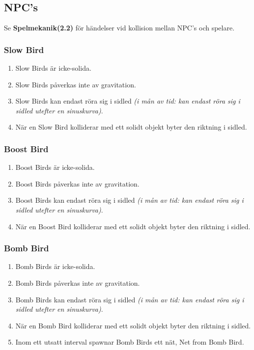 \documentclass{TDP003mall}
\begin{document}
\subsection{NPC's}
Se \textbf{Spelmekanik(2.2)} för händelser vid kollision mellan NPC's och spelare.

\subsubsection{Slow Bird}
\begin{enumerate}
\item Slow Birds är icke-solida.
\item Slow Birds påverkas inte av gravitation.
\item Slow Birds kan endast röra sig i sidled \textit{(i mån av tid: kan endast röra sig i sidled utefter en sinuskurva)}.
\item När en Slow Bird kolliderar med ett solidt objekt byter den riktning i sidled.
\end{enumerate}

\subsubsection{Boost Bird}
\begin{enumerate}
\item Boost Birds är icke-solida.
\item Boost Birds påverkas inte av gravitation.
\item Boost Birds kan endast röra sig i sidled \textit{(i mån av tid: kan endast röra sig i sidled utefter en sinuskurva)}.
\item När en Boost Bird kolliderar med ett solidt objekt byter den riktning i sidled.
\end{enumerate}

\subsubsection{Bomb Bird}
\begin{enumerate}
\item Bomb Birds är icke-solida.
\item Bomb Birds påverkas inte av gravitation.
\item Bomb Birds kan endast röra sig i sidled \textit{(i mån av tid: kan endast röra sig i sidled utefter en sinuskurva)}.
\item När en Bomb Bird kolliderar med ett solidt objekt byter den riktning i sidled.
\item Inom ett utsatt interval spawnar Bomb Birds ett nät, Net from Bomb Bird.
\end{enumerate}
\end{document}
